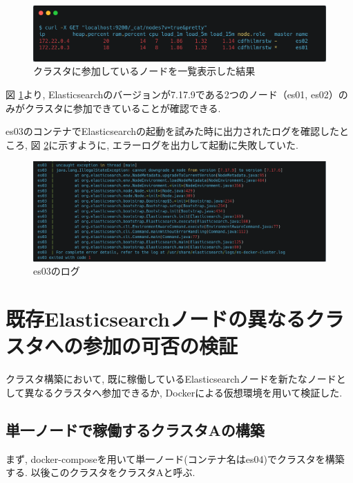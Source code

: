 \begin{figure}[H]
  \begin{center}
    \includegraphics[width=140mm]{sotu/figure/curl-different.png}
    \caption{クラスタに参加しているノードを一覧表示した結果}
    \label{4-p6}
  \end{center}
\end{figure}

図 \ref{4-p6}より, Elasticsearchのバージョンが7.17.9である2つのノード（es01, es02）のみがクラスタに参加できていることが確認できる.

es03のコンテナでElasticsearchの起動を試みた時に出力されたログを確認したところ, 図 \ref{4-p7}に示すように, エラーログを出力して起動に失敗していた.

\begin{figure}[H]
  \begin{center}
    \includegraphics[width=140mm]{sotu/figure/log.png}
    \caption{es03のログ}
    \label{4-p7}
  \end{center}
\end{figure}

\section{既存Elasticsearchノードの異なるクラスタへの参加の可否の検証}
クラスタ構築において, 既に稼働しているElasticsearchノードを新たなノードとして異なるクラスタへ参加できるか, Dockerによる仮想環境を用いて検証した.

\subsection{単一ノードで稼働するクラスタAの構築}

まず, docker-composeを用いて単一ノード(コンテナ名はes04)でクラスタを構築する. 以後このクラスタをクラスタAと呼ぶ.

